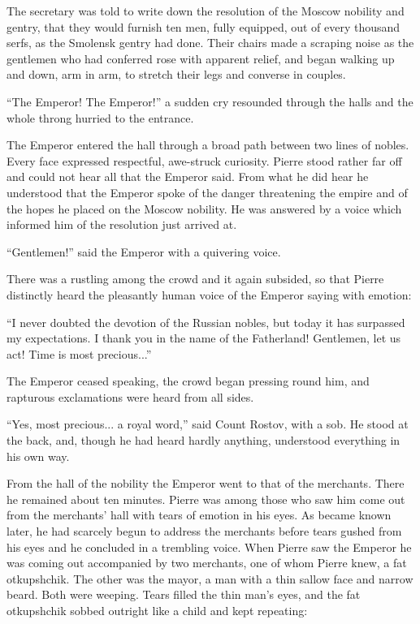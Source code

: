 The secretary was told to write down the resolution of the Moscow
nobility and gentry, that they would furnish ten men, fully
equipped, out of every thousand serfs, as the Smolensk gentry had
done. Their chairs made a scraping noise as the gentlemen who had
conferred rose with apparent relief, and began walking up and
down, arm in arm, to stretch their legs and converse in couples.

``The Emperor! The Emperor!'' a sudden cry resounded through the
halls and the whole throng hurried to the entrance.

The Emperor entered the hall through a broad path between two
lines of nobles. Every face expressed respectful, awe-struck
curiosity. Pierre stood rather far off and could not hear all
that the Emperor said. From what he did hear he understood that
the Emperor spoke of the danger threatening the empire and of the
hopes he placed on the Moscow nobility. He was answered by a
voice which informed him of the resolution just arrived at.

``Gentlemen!'' said the Emperor with a quivering voice.

There was a rustling among the crowd and it again subsided, so
that Pierre distinctly heard the pleasantly human voice of the
Emperor saying with emotion:

``I never doubted the devotion of the Russian nobles, but today
it has surpassed my expectations. I thank you in the name of the
Fatherland!  Gentlemen, let us act! Time is most precious...''

The Emperor ceased speaking, the crowd began pressing round him,
and rapturous exclamations were heard from all sides.

``Yes, most precious... a royal word,'' said Count Rostov, with a
sob. He stood at the back, and, though he had heard hardly
anything, understood everything in his own way.

From the hall of the nobility the Emperor went to that of the
merchants.  There he remained about ten minutes. Pierre was among
those who saw him come out from the merchants' hall with tears of
emotion in his eyes. As became known later, he had scarcely begun
to address the merchants before tears gushed from his eyes and he
concluded in a trembling voice.  When Pierre saw the Emperor he
was coming out accompanied by two merchants, one of whom Pierre
knew, a fat otkupshchik. The other was the mayor, a man with a
thin sallow face and narrow beard. Both were weeping. Tears
filled the thin man's eyes, and the fat otkupshchik sobbed
outright like a child and kept repeating:

